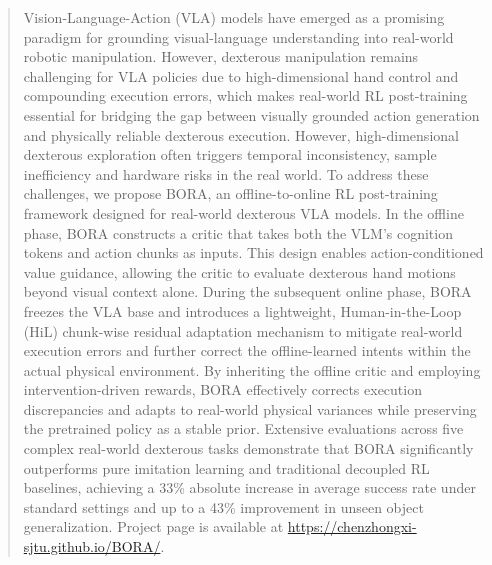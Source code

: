 \documentclass{article}
\begin{document}
\begin{abstract}
Vision-Language-Action (VLA) models have emerged as a promising paradigm for grounding visual-language understanding into real-world robotic manipulation. However, dexterous manipulation remains challenging for VLA policies due to high-dimensional hand control and compounding execution errors, which makes real-world RL post-training essential for bridging the gap between visually grounded action generation and physically reliable dexterous execution. However, high-dimensional dexterous exploration often triggers temporal inconsistency, sample inefficiency and hardware risks in the real world. To address these challenges, we propose BORA, an offline-to-online RL post-training framework designed for real-world dexterous VLA models. In the offline phase, BORA constructs a critic that takes both the VLM's cognition tokens and action chunks as inputs. This design enables action-conditioned value guidance, allowing the critic to evaluate dexterous hand motions beyond visual context alone. During the subsequent online phase, BORA freezes the VLA base and introduces a lightweight, Human-in-the-Loop (HiL) chunk-wise residual adaptation mechanism to mitigate real-world execution errors and further correct the offline-learned intents within the actual physical environment. By inheriting the offline critic and employing intervention-driven rewards, BORA effectively corrects execution discrepancies and adapts to real-world physical variances while preserving the pretrained policy as a stable prior. Extensive evaluations across five complex real-world dexterous tasks demonstrate that BORA significantly outperforms pure imitation learning and traditional decoupled RL baselines, achieving a 33\% absolute increase in average success rate under standard settings and up to a 43\% improvement in unseen object generalization. Project page is available at \url{https://chenzhongxi-sjtu.github.io/BORA/}.
\end{abstract}




\end{document}
